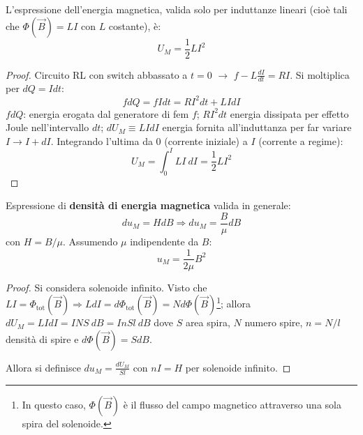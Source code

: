 \documentclass[10pt, a4paper]{scrartcl}
\numberwithin{equation}{subsection}
\theoremstyle{style1}
\newenvironment{boxenv}[1][]{
    \begin{eqbox}[#1]
    }{
   \end{eqbox}
}
\begin{document}
L'espressione dell'energia magnetica, valida solo per induttanze lineari (cio\`e tali che $\Phi(\vec{B}) = L I$ con $L$ costante), \`e:
\begin{equation}
	U_M = \frac{1}{2}LI^2
\end{equation}
\begin{boxenv}[]
\begin{proof}
	Circuito RL con switch abbassato a $t=0$ $\to$ $f - L \frac{d I}{d t} = RI$. Si moltiplica per $dQ = Idt$:
	\[
	fdQ =f I dt= RI^2 dt + L I dI
	\] 
$fdQ$: energia erogata dal generatore di fem $f$; $RI^2 dt$ energia dissipata per effetto Joule nell'intervallo $dt$; $dU_M \equiv LIdI$ energia fornita all'induttanza per far variare $I\to I+dI$. Integrando l'ultima da $0$ (corrente iniziale) a $I$ (corrente a regime):
\[
U_M = \int_{0} ^I LI \ dI = \frac{1}{2}LI^2
\] 

\end{proof}
\end{boxenv}
\noindent Espressione di \textbf{densit\`a di energia magnetica} valida in generale:
\begin{equation}
	du_M = HdB \Rightarrow du_M = \frac{B}{\mu }dB
\end{equation}
con $H = B / \mu $. Assumendo $\mu $ indipendente da $B$:
\begin{equation}
	u_M = \frac{1}{2\mu }B^2
\end{equation}
\begin{boxenv}[]
\begin{proof}
	Si considera solenoide infinito. Visto che $LI = \Phi_\text{tot}(\vec{B}) \Rightarrow LdI = d\Phi_\text{tot}(\vec{B}) = N d\Phi(\vec{B})$\footnote{In questo caso, $\Phi(\vec{B})$ \`e il flusso del campo magnetico attraverso una sola spira del solenoide.}; allora $dU_M = LIdI = INS\ dB = InSl\ dB$ dove $S$ area spira, $N$ numero spire, $n = N / l$ densit\`a di spire e $d\Phi(\vec{B}) = SdB$. 

	Allora si definisce $du_M = \frac{dU_M}{Sl}$ con $nI = H$ per solenoide infinito.
\end{proof}
\end{boxenv}
\end{document}
